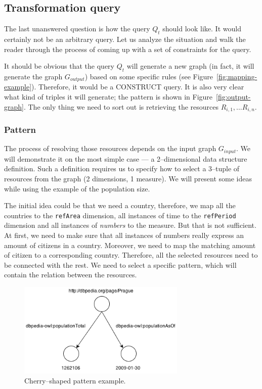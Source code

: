 \subsection{Transformation query}

The last unanswered question is how the query $Q_t$ should look like. 
It would certainly not be an arbitrary query. Let us analyze the situation and 
walk the reader through the process of coming up with a set of constraints for the 
query.

It should be obvious that the query $Q_t$ will generate a new graph
(in fact, it will generate the graph $G_{output}$) based on some specific rules
(see Figure~\ref{fig:mapping-example}). 
Therefore, it would be a CONSTRUCT query. It is also very clear what kind of 
triples it will generate; the pattern is shown in Figure~\ref{fig:output-graph}.
The only thing we need to sort out is retrieving the resources $R_{i,1}, ... R_{i,n}$.

\subsubsection{Pattern}
\label{sec:pattern-definition}
The process of resolving those resources depends on the input graph $G_{input}$.
We will demonstrate it on the most simple case --- a 2--dimensional data structure 
definition. Such a definition requires us to specify how to select a 3--tuple of resources from 
the graph (2 dimensions, 1 measure).
We will present some ideas while using the example of the population size.

The initial idea could be that we need a country, therefore, we map all the 
countries to the \texttt{refArea} dimension, all instances of time to the \texttt{refPeriod} 
dimension and all instances of \emph{numbers} to the measure. But that is not sufficient. At first,
we need to make sure that all instances of numbers 
really express an amount of citizens in a country. Moreover, we need to map the
matching amount of citizen to a corresponding country. Therefore, all the 
selected resources need to be connected with the rest. We need to select a 
specific pattern, which will contain the relation between the resources.

\begin{figure}
	\centering
	\includegraphics[width=80mm]{images/cherry.png}
	\caption{Cherry--shaped pattern example.}
	\label{fig:cherry}
\end{figure}

